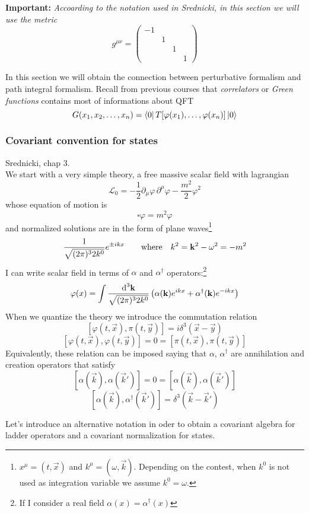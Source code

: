 \documentclass[../main/main.tex]{subfiles}
\let\temp\phi
\let\phi\varphi
\let\varphi\temp
\begin{document}
\textbf{Important:} \textit{Accoarding to the notation used in Srednicki, in this section we will use the metric}
\[g^{\mu\nu}=\begin{pmatrix}-1&&&\\&1&&\\&&1&\\&&&1\end{pmatrix}\]

\skipline
In this section we will obtain the connection between perturbative formalism and path integral formalism.
Recall from previous courses that \emph{correlators} or \emph{Green functions} contains most of informations about QFT
\[G(x_1,x_2,\dots,x_n)=\bra0T[\phi(x_1),\dots,\varphi(x_n)]\ket0\]

\subsubsection{Covariant convention for states}
\textsf{Srednicki, chap 3}.\\

We start with a very simple theory, a free massive scalar field with lagrangian
\[\mathcal L_0=-\frac12\partial_\mu\phi\,\partial^\mu\phi-\frac{m^2}2\phi^2\]
whose  equation of motion is 
\[\square\phi=m^2\phi\]
and normalized solutions are in the form of plane waves\footnote{$x^\mu=(t,\vec x)$ and $k^\mu=(\omega,\vec k)$. Depending on the contest, when $k^0$ is not used as integration variable we assume $k^0=\omega$.}
\[ \frac1{\sqrt{(2\pi)^32k^0}}e^{\pm ik x}\qquad\textup{where}\quad k^2=\vec k^2-\omega^2=-m^2\]
I can write scalar field in terms of $\alpha$ and $\alpha^\dagger$ operators:\footnote{If I consider a real field $\alpha(x)=\alpha^\dagger(x)$}
\[\phi(x)=\int\frac{\de^3\vec k}{\sqrt{(2\pi)^32k^0}}\left(\alpha(\vec k)e^{ikx}+\alpha^\dagger(\vec k)e^{-ikx}\right)\]
When we quantize the theory we introduce the commutation relation
\[[\phi(t,\vec x),\pi(t,\vec y)]=i\delta^3(\vec x-\vec y)\]
\[[\phi(t,\vec x),\phi(t,\vec y)]=0=[\pi(t,\vec x),\pi(t,\vec y)]\]
Equivalently, these relation can be imposed saying that $\alpha$, $\alpha^\dagger$ are annihilation and creation operators that satisfy
\[[\alpha(\vec k),\alpha(\vec k')]=0=[\alpha(\vec k),\alpha(\vec k')]\]
\[[\alpha(\vec k), \alpha^\dagger(\vec k')]=\delta^3(\vec k-\vec k')\]

\skipline


Let's introduce an alternative notation in oder to obtain a covariant algebra for ladder operators and a covariant normalization for states.
\end{document}

